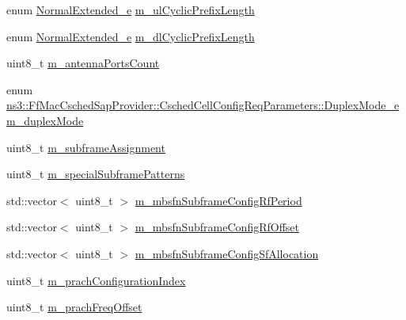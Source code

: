 \begin{DoxyCompactItemize}
\item 
enum \hyperlink{namespacens3_acf4e55ff5777ad2ac5ce429a45c38506}{Normal\+Extended\+\_\+e} \hyperlink{structns3_1_1FfMacCschedSapProvider_1_1CschedCellConfigReqParameters_a586efa8b972393ea20ac6a8e2e5e4200}{m\+\_\+ul\+Cyclic\+Prefix\+Length}
\item 
enum \hyperlink{namespacens3_acf4e55ff5777ad2ac5ce429a45c38506}{Normal\+Extended\+\_\+e} \hyperlink{structns3_1_1FfMacCschedSapProvider_1_1CschedCellConfigReqParameters_aadab383c009312fe13b893fda21e62c2}{m\+\_\+dl\+Cyclic\+Prefix\+Length}
\item 
uint8\+\_\+t \hyperlink{structns3_1_1FfMacCschedSapProvider_1_1CschedCellConfigReqParameters_a9209b477f1846427bbabb09c6448366f}{m\+\_\+antenna\+Ports\+Count}
\item 
enum \hyperlink{structns3_1_1FfMacCschedSapProvider_1_1CschedCellConfigReqParameters_a0d96ae81c20f457c9b3f2af098dc6f3f}{ns3\+::\+Ff\+Mac\+Csched\+Sap\+Provider\+::\+Csched\+Cell\+Config\+Req\+Parameters\+::\+Duplex\+Mode\+\_\+e} \hyperlink{structns3_1_1FfMacCschedSapProvider_1_1CschedCellConfigReqParameters_ae082179202920f91e0a3149a7bd545e4}{m\+\_\+duplex\+Mode}
\item 
uint8\+\_\+t \hyperlink{structns3_1_1FfMacCschedSapProvider_1_1CschedCellConfigReqParameters_abac302e3cba0b39094bb9c525e7adec5}{m\+\_\+subframe\+Assignment}
\item 
uint8\+\_\+t \hyperlink{structns3_1_1FfMacCschedSapProvider_1_1CschedCellConfigReqParameters_aac4c982ad735c236859000a80a7cb8c7}{m\+\_\+special\+Subframe\+Patterns}
\item 
std\+::vector$<$ uint8\+\_\+t $>$ \hyperlink{structns3_1_1FfMacCschedSapProvider_1_1CschedCellConfigReqParameters_ad43e8d28b1acfcd5d2608a76b052b930}{m\+\_\+mbsfn\+Subframe\+Config\+Rf\+Period}
\item 
std\+::vector$<$ uint8\+\_\+t $>$ \hyperlink{structns3_1_1FfMacCschedSapProvider_1_1CschedCellConfigReqParameters_a5a6432ed14b9ad374707395746e99895}{m\+\_\+mbsfn\+Subframe\+Config\+Rf\+Offset}
\item 
std\+::vector$<$ uint8\+\_\+t $>$ \hyperlink{structns3_1_1FfMacCschedSapProvider_1_1CschedCellConfigReqParameters_a8371052c1146a28d234cfba2531c7354}{m\+\_\+mbsfn\+Subframe\+Config\+Sf\+Allocation}
\item 
uint8\+\_\+t \hyperlink{structns3_1_1FfMacCschedSapProvider_1_1CschedCellConfigReqParameters_a481749010ed28a0762195b37426efff7}{m\+\_\+prach\+Configuration\+Index}
\item 
uint8\+\_\+t \hyperlink{structns3_1_1FfMacCschedSapProvider_1_1CschedCellConfigReqParameters_a3671b4444e4c4331de80dad5a50eab4c}{m\+\_\+prach\+Freq\+Offset}

\end{DoxyCompactItemize}
